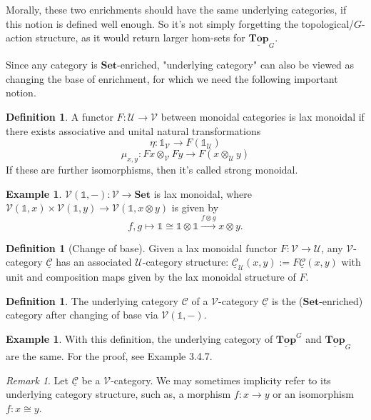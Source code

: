 \documentclass[11pt]{article}
\theoremstyle{definition}
\newtheorem{definition}[theorem]{Definition}
\newtheorem{example}[theorem]{Example}
\theoremstyle{remark}
\newtheorem{remark}[theorem]{Remark}
\newcommand{\Top}{\mathbf{Top}}
\newcommand{\calC}{\mathcal{C}}
\newcommand{\ucalC}{\underline{\mathcal{C}}}
\newcommand{\calU}{\mathcal{U}}
\newcommand{\calV}{\mathcal{V}}
\newcommand{\bbone}{\mathbb{1}}
\newcommand{\bfset}{\mathbf{Set}}
\begin{document}
Morally, these two enrichments should have the same underlying categories, if this notion is defined well enough.
So it's not simply forgetting the topological/$G$-action structure, as it would return larger hom-sets for $\underline{\Top}_G$.

Since any category is $\bfset$-enriched, "underlying category" can also be viewed as changing the base of enrichment,
for which we need the following important notion.

\begin{definition}
    A functor $F : \calU \to \calV$ between monoidal categories is lax monoidal if there exists associative and unital natural transformations
    \[
        \eta : \bbone_{\calV} \to F(\bbone_{\calU})
    \]
    \[
        \mu_{x,y} : F x \otimes_{\calV} F y \to F(x \otimes_{\calU} y)
    \]
    If these are further isomorphisms, then it's called strong monoidal.
\end{definition}

\begin{example}
    $\calV(\bbone,-) : \calV \to \bfset$ is lax monoidal,
    where $\calV(\bbone,x) \times \calV(\bbone,y) \to \calV(\bbone,x \otimes y)$ is given by
    $$f,g \mapsto \bbone \cong \bbone \otimes \bbone \stackrel{f\otimes g}{\to} x \otimes y.$$  
\end{example}

\begin{definition}[Change of base]
    Given a lax monoidal functor $F : \calV \to \calU$, any $\calV$-category $\ucalC$ has an associated $\calU$-category structure:
    $\ucalC_{\calU}(x,y) := F\ucalC(x,y)$ with unit and composition maps given by the lax monoidal structure of $F$.
\end{definition}

\begin{definition}
    The underlying category $\calC$ of a $\calV$-category $\ucalC$ is the
    ($\bfset$-enriched) category after changing of base via $\calV(\bbone, -)$.
\end{definition}

\begin{example}
    With this definition, the underlying category of $\underline{\Top}^G$ and $\underline{\Top}_G$ are the same.
    For the proof, see Example 3.4.7.
\end{example}

\begin{remark}
    \label{morphism-isomorphism-enriched}
    Let $\ucalC$ be a $\calV$-category. We may sometimes implicity refer to its underlying category structure,
    such as, a morphism $f : x \to y$ or an isomorphism $f : x \cong y$.
\end{remark}
\end{document}
